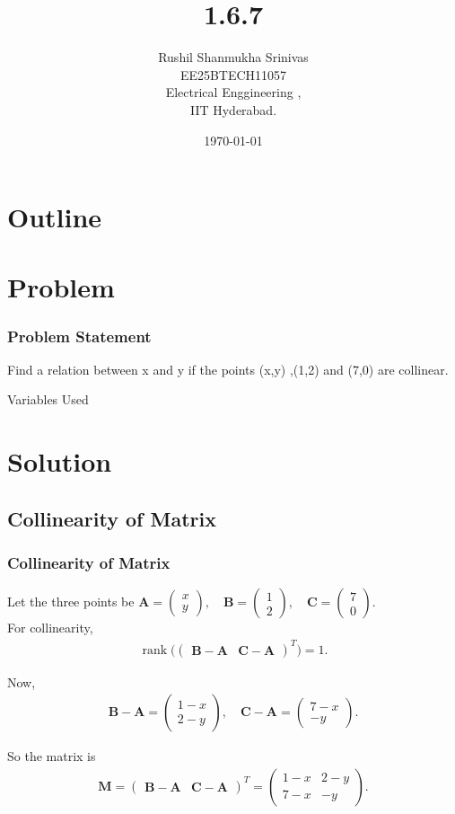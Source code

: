 \documentclass{beamer}
\title{1.6.7}
\author{Rushil Shanmukha Srinivas \\EE25BTECH11057 \\ Electrical Enggineering ,\\IIT Hyderabad.}
\date{\today}
\theoremstyle{remark}
\newcommand{\myvec}[1]{\ensuremath{\begin{pmatrix}#1\end{pmatrix}}}
\let\vec\mathbf
\numberwithin{equation}{section}
\begin{document}
 

\begin{frame}
\titlepage
\end{frame}

\section*{Outline}
\begin{frame}
\tableofcontents
\end{frame}
\section{Problem}
\begin{frame}
\frametitle{Problem Statement}

Find a relation between x and y if the points (x,y) ,(1,2) and (7,0) are collinear.
\\ \begin{table}[h!]    
  \centering
  
  \caption{Variables Used}
\end{table}
\end{frame}
\section{Solution}
\subsection{Collinearity of Matrix}
\begin{frame}
\frametitle{Collinearity of Matrix}
Let the three points be
$
\vec{A}=\myvec {x \\ y} ,\quad
\vec{B}=\myvec {1 \\ 2} , \quad 
\vec{C}=\myvec {7 \\ 0}.
$
\\

For collinearity, 
\begin{align}
\operatorname{rank}\!\Big( \myvec {\vec{B}-\vec{A} & \vec{C}-\vec{A} }^T \Big) = 1.
\end{align}

Now,
\begin{align}
\vec{B}-\vec{A} = \myvec{1-x \\ 2-y} , \quad
\vec{C}-\vec{A} = \myvec{7-x \\ -y}.
\end{align}

So the matrix is
\begin{align}
\vec{M} = \myvec {\vec{B}-\vec{A} & \vec{C}-\vec{A} }^T
= \myvec{
1-x & 2-y \\
7-x & -y}.
\end{align}
\end{frame}
\end{document}
